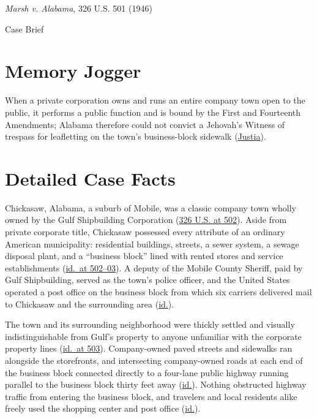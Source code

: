 \documentclass[12pt]{article}
\begin{document}
\begin{center}
{\LARGE \textit{Marsh v. Alabama}, 326 U.S. 501 (1946)\par}
\vspace{0.8em}
{\large Case Brief\par}
\end{center}
\vspace{1em}

\section{Memory Jogger}
When a private corporation owns and runs an entire company town open to the public, it performs a public function and is bound by the First and Fourteenth Amendments; Alabama therefore could not convict a Jehovah's Witness of trespass for leafletting on the town's business-block sidewalk (\href{https://supreme.justia.com/cases/federal/us/326/501/}{Justia}).

\section{Detailed Case Facts}
Chickasaw, Alabama, a suburb of Mobile, was a classic company town wholly owned by the Gulf Shipbuilding Corporation (\href{https://supreme.justia.com/cases/federal/us/326/501/}{326 U.S. at 502}). Aside from private corporate title, Chickasaw possessed every attribute of an ordinary American municipality: residential buildings, streets, a sewer system, a sewage disposal plant, and a ``business block'' lined with rented stores and service establishments (\href{https://supreme.justia.com/cases/federal/us/326/501/}{id.\ at 502--03}). A deputy of the Mobile County Sheriff, paid by Gulf Shipbuilding, served as the town's police officer, and the United States operated a post office on the business block from which six carriers delivered mail to Chickasaw and the surrounding area (\href{https://supreme.justia.com/cases/federal/us/326/501/}{id.}).

The town and its surrounding neighborhood were thickly settled and visually indistinguishable from Gulf's property to anyone unfamiliar with the corporate property lines (\href{https://supreme.justia.com/cases/federal/us/326/501/}{id.\ at 503}). Company-owned paved streets and sidewalks ran alongside the storefronts, and intersecting company-owned roads at each end of the business block connected directly to a four-lane public highway running parallel to the business block thirty feet away (\href{https://supreme.justia.com/cases/federal/us/326/501/}{id.}). Nothing obstructed highway traffic from entering the business block, and travelers and local residents alike freely used the shopping center and post office (\href{https://supreme.justia.com/cases/federal/us/326/501/}{id.}).
\end{document}
